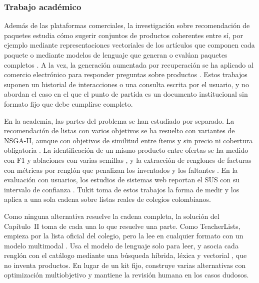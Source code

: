 \subsubsection{Trabajo académico}

Además de las plataformas comerciales, la investigación sobre recomendación de paquetes estudia cómo
sugerir conjuntos de productos coherentes entre sí, por ejemplo mediante representaciones vectoriales de
los artículos que componen cada paquete \citep{avny_brosh_bruce_2022,du_enhancing_2025} o mediante modelos
de lenguaje que generan o evalúan paquetes completos \citep{liu_llmcbr_2025,bayrak_evaluating_2024}. A la
vez, la generación aumentada por recuperación se ha aplicado al comercio electrónico para responder
preguntas sobre productos \citep{xu_itemrag_2026}. Estos trabajos suponen un historial de interacciones o
una consulta escrita por el usuario, y no abordan el caso en el que el punto de partida es un documento
institucional sin formato fijo que debe cumplirse completo.\par

En la academia, las partes del problema se han estudiado por separado. La recomendación de listas con varios objetivos se ha resuelto con variantes de NSGA-II, aunque con objetivos de similitud entre ítems y sin precio ni cobertura obligatoria \citep{lotfian_himars_2026}. La identificación de un mismo producto entre ofertas se ha medido con F1 y ablaciones con varias semillas \citep{almagro_blocking_2022}, y la extracción de renglones de facturas con métricas por renglón que penalizan los inventados y los faltantes \citep{cesista_retrieval_2024}. En la evaluación con usuarios, los estudios de sistemas web reportan el SUS con su intervalo de confianza \citep{kian_dart_2026}. Tukit toma de estos trabajos la forma de medir y los aplica a una sola cadena sobre listas reales de colegios colombianos.\par


Como ninguna alternativa resuelve la cadena completa, la solución del Capítulo~II toma de cada una lo que
resuelve una parte. Como TeacherLists, empieza por la lista oficial del colegio, pero la lee
en cualquier formato con un modelo multimodal \citep{shen_ocr_2026}. Usa el modelo de lenguaje solo para
leer, y asocia cada renglón con el catálogo mediante una búsqueda híbrida, léxica y vectorial
\citep{karpukhin_dense_2020}, que no inventa productos. En lugar de un kit fijo, construye varias alternativas con optimización multiobjetivo \citep{deb_fast_2002} y mantiene la
revisión humana en los casos dudosos.\par

